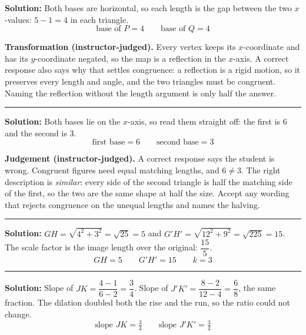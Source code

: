 \documentclass[12pt]{article}
\begin{document}
\textbf{Solution:} \quad Both bases are horizontal, so each length is the gap between
the two $x$-values: $5 - 1 = 4$ in each triangle.
\[ \boxed{\text{base of } P = 4 \qquad \text{base of } Q = 4} \]

\textbf{Transformation (instructor-judged).} Every vertex keeps its $x$-coordinate and has its
$y$-coordinate negated, so the map is a reflection in the $x$-axis. A correct response also says
why that settles congruence: a reflection is a rigid motion, so it preserves every length and
angle, and the two triangles must be congruent. Naming the reflection without the length
argument is only half the answer.

\vspace{0.2cm}

\noindent\rule{\linewidth}{0.2pt}


\textbf{Solution:} \quad Both bases lie on the $x$-axis, so read them straight off: the first is
$6$ and the second is $3$.
\[ \boxed{\text{first base} = 6 \qquad \text{second base} = 3} \]

\textbf{Judgement (instructor-judged).} A correct response says the student is wrong. Congruent
figures need equal matching lengths, and $6 \neq 3$. The right description is \textit{similar}:
every side of the second triangle is half the matching side of the first, so the two are the same
shape at half the size. Accept any wording that rejects congruence on the unequal lengths and
names the halving.

\vspace{0.2cm}

\noindent\rule{\linewidth}{0.2pt}


\textbf{Solution:} \quad $GH = \sqrt{4^2 + 3^2} = \sqrt{25} = 5$ and
$G'H' = \sqrt{12^2 + 9^2} = \sqrt{225} = 15$. The scale factor is the image length over the
original: $\dfrac{15}{5}$.
\[ \boxed{GH = 5 \qquad G'H' = 15 \qquad k = 3} \]

\vspace{0.2cm}

\noindent\rule{\linewidth}{0.2pt}


\textbf{Solution:} \quad Slope of $JK = \dfrac{4-1}{6-2} = \dfrac{3}{4}$. Slope of
$J'K' = \dfrac{8-2}{12-4} = \dfrac{6}{8}$, the same fraction. The dilation doubled both the rise
and the run, so the ratio could not change.
\[ \boxed{\text{slope } JK = \tfrac{3}{4} \qquad \text{slope } J'K' = \tfrac{3}{4}} \]
\end{document}

